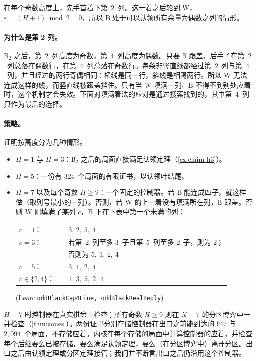 \documentclass[11pt,a4paper]{article}
\theoremstyle{zhthm}
\newcommand{\code}[1]{{\upshape\texttt{\small\nolinkurl{#1}}}}
\newcommand{\leanref}[1]{(Lean: \code{#1})}
\newcommand{\B}{\mathrm{B}}
\newcommand{\W}{\mathrm{W}}
\newcommand{\eps}{\varepsilon}
\begin{document}
在每个奇数高度上，先手首着下第~$2$~列。这一着之后轮到 $\W$，$\eps=(H+1)\bmod 2=0$，所以 $\B$ 处于可以认领所有余量为偶数之列的情形。

\paragraph{为什么是第 2 列。}$\B_2$ 之后，第~$2$~列高度为奇数，第~$4$~列高度为偶数。只要 $\B$ 跟盖，后手子在第~$2$~列总落在偶数行，在第~$4$~列总落在奇数行。每条非竖直线都经过第~$2$~列与第~$4$~列，并且经过的两行奇偶相同：横线是同一行，斜线是相隔两行。所以 $\W$ 无法连成这样的线，而竖直线被跟盖挡住。只有当 $\W$ 填满一列、$\B$ 不得不到别处应着时，这个机制才会失效。下面对填满着法的应对是通过搜索找到的，其中第~$4$~列只作为最后的选择。

\paragraph{策略。}证明按高度分为几种情形。
\begin{itemize}
  \item $H=1$ 与 $H=3$：$\B_2$ 之后的局面直接满足认领定理（\cref{ex:claim-h3}）。
  \item $H=5$：一份有 $324$~个局面的有限证书，以认领叶结尾。
  \item $H=7$ 以及每个奇数 $H\ge 9$：一个固定的控制器。若 $\B$ 能连成四子，就这样做（取列号最小的一列）。否则，若 $\W$ 的上一着没有填满所在列，$\B$ 跟盖。否则 $\W$ 刚填满了某列 $c$，$\B$ 下在下表中第一个未满的列：
  \begin{center}
  \small
  \begin{tabular}{@{}ll@{}}
    $c=1$： & $3,\ 2,\ 5,\ 4$\\
    $c=3$： & 若第~$2$~列至多 $3$~子且第~$5$~列至多 $2$~子，则为 $2$；\\
            & 否则为 $5,\ 1,\ 2,\ 4$\\
    $c=5$： & $3,\ 1,\ 2,\ 4$\\
    $c\in\{2,4\}$：\ \ & $1,\ 3,\ 5,\ 2,\ 4$
  \end{tabular}
  \end{center}
  \leanref{oddBlackCap4Line, oddBlackRealReply}
\end{itemize}
$H=7$ 时控制器在真实棋盘上检查；所有奇数 $H\ge 9$ 则在 $K=7$ 的分区博弈中一并检查（\cref{thm:zones}）。两份证书分别存储控制器在出口之前能到达的 $947$ 与 $2{,}094$~个局面，不存储应着。内核在每个存储的局面中计算控制器的应着，并检查每个后继要么已被存储，要么满足认领定理，要么（在分区博弈中）离开分区。出口之后由认领定理或分区定理接管；我们并不断言出口之后仍沿用这个控制器。
\end{document}
